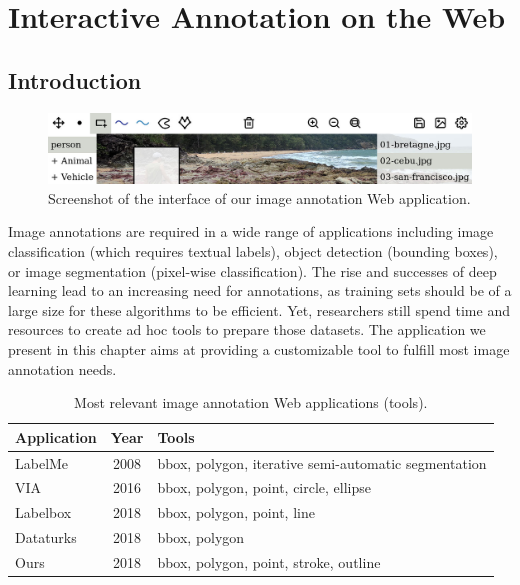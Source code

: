\chapter{Interactive Annotation on the Web}%
\label{cha:interactive_annotation_on_the_web}

\minitoc%
\clearpage

\section{Introduction}

\begin{figure}[ht]
  \includegraphics[width=\textwidth]{assets/img/annotation-app-thin.jpg}
  \caption{Screenshot of the interface of our image annotation Web application.}%
  \label{fig:teaser}
\end{figure}

Image annotations are required in a wide range of applications
including image classification (which requires textual labels),
object detection (bounding boxes), or image segmentation (pixel-wise classification).
The rise and successes of deep learning lead to an increasing need for annotations,
as training sets should be of a large size for these algorithms to be efficient.
Yet, researchers still spend time and resources
to create ad hoc tools to prepare those datasets.
The application we present in this chapter aims at providing a customizable tool
to fulfill most image annotation needs.

\begin{table}[ht]
\centering
\begin{tabular}{lcl}
Application
	& Year
    & Tools\\
    \midrule
LabelMe
	& 2008
	& bbox, polygon, iterative semi-automatic segmentation\\
VIA
	& 2016
	& bbox, polygon, point, circle, ellipse\\
Labelbox
	& 2018
	& bbox, polygon, point, line\\
Dataturks
	& 2018
    & bbox, polygon\\
Ours
	& 2018
	& bbox, polygon, point, stroke, outline\\
\end{tabular}

\caption{Most relevant image annotation Web applications (tools).}%
\label{tab:web-apps-1}
\end{table}

